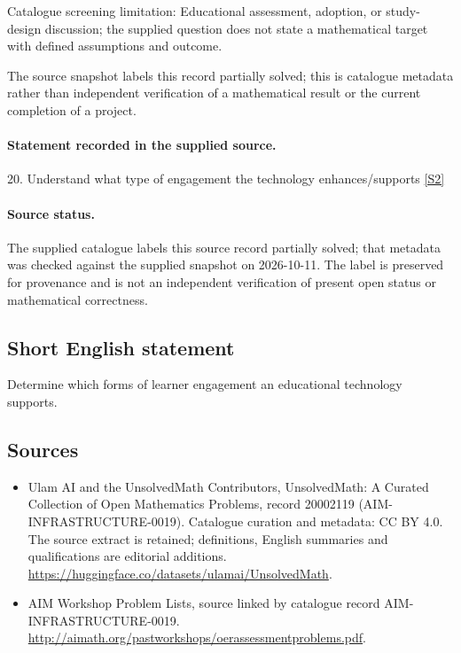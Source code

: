 \documentclass[11pt]{article}
\begin{document}
Catalogue screening limitation: Educational assessment, adoption, or study-design discussion; the supplied question does not state a mathematical target with defined assumptions and outcome.

The source snapshot labels this record partially solved; this is catalogue metadata rather than independent verification of a mathematical result or the current completion of a project.
\paragraph{Statement recorded in the supplied source.}
20. Understand what type of engagement the technology enhances/supports \href{http://aimath.org/pastworkshops/oerassessmentproblems.pdf}{[S2]}
\paragraph{Source status.}
The supplied catalogue labels this source record partially solved; that metadata was checked against the supplied snapshot on 2026-10-11. The label is preserved for provenance and is not an independent verification of present open status or mathematical correctness.
\subsection{Short English statement}
Determine which forms of learner engagement an educational technology supports.
\subsection{Sources}
\begin{itemize}
\item[S1] Ulam AI and the UnsolvedMath Contributors, UnsolvedMath: A Curated Collection of Open Mathematics Problems, record 20002119 (AIM-INFRASTRUCTURE-0019). Catalogue curation and metadata: CC BY 4.0. The source extract is retained; definitions, English summaries and qualifications are editorial additions.
\url{https://huggingface.co/datasets/ulamai/UnsolvedMath}.
\item[S2] AIM Workshop Problem Lists, source linked by catalogue record AIM-INFRASTRUCTURE-0019.
\url{http://aimath.org/pastworkshops/oerassessmentproblems.pdf}.
\end{itemize}
\end{document}
